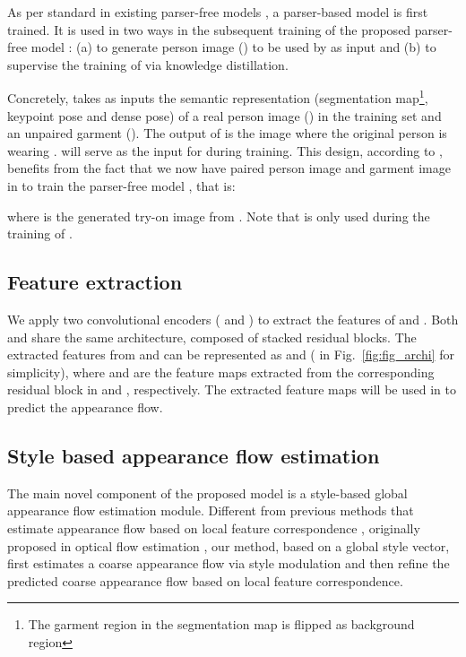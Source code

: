 \documentclass[10pt,twocolumn,letterpaper]{article}
\begin{document}
As per standard in existing parser-free models \cite{issenhuth2020not, ge2021parser}, a parser-based model  is first trained. It is used in two ways in the subsequent training of the proposed parser-free model : (a) to generate  person image () to be used by  as input and (b) to supervise the training of  via knowledge distillation.

Concretely,  takes as inputs the semantic representation (segmentation map\footnote{The garment region in the segmentation map is flipped as background region}, keypoint pose and dense pose) of a real person image () in the training set and an unpaired garment (). The output of  is the image  where the original person is wearing .  will serve as the input for  during training.  This design, according to \cite{ge2021parser}, benefits from the fact that we now have  paired person image  and garment image  in  to train the parser-free model , that is:

where  is the generated try-on image from . Note that  is only used during the training of .

\subsection{Feature extraction}

We apply two convolutional encoders ( and ) to extract the features of  and . Both  and  share the same architecture, composed of stacked residual blocks. The extracted features from  and  can be represented as  and  ( in Fig.~\ref{fig:fig_archi} for simplicity), where  and  are the feature maps extracted from the corresponding residual block in  and , respectively. The extracted feature maps will be used in  to predict the appearance flow.

\subsection{Style based appearance flow estimation}

The main novel component of the proposed model is a  style-based global appearance flow estimation module. Different from previous methods that estimate appearance flow based on local feature correspondence \cite{han2019clothflow, ge2021parser}, originally proposed in optical flow estimation \cite{dosovitskiy2015flownet, ilg2017flownet}, our method, based on a global style vector, first estimates a coarse appearance flow via style modulation and then refine the predicted coarse appearance flow based on local feature correspondence. 
\end{document}
